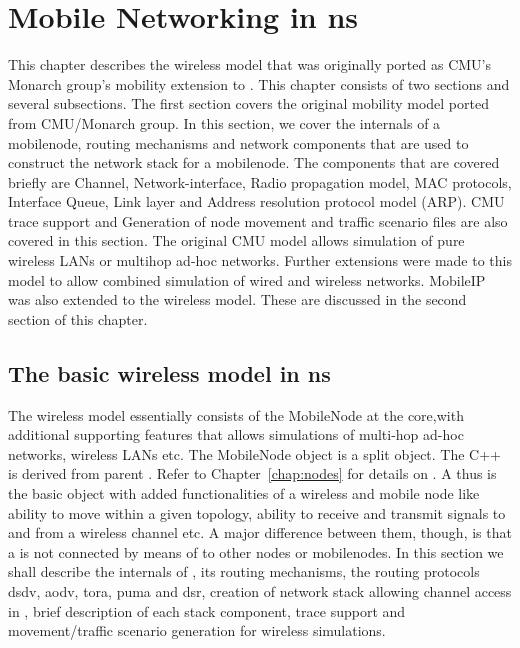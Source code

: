 %
\chapter{Mobile Networking in ns}
\label{chap:mobility}

This chapter describes the wireless model that was originally ported as CMU's Monarch group's mobility extension to \ns. 
This chapter consists of two sections and several subsections. The
first section covers the original mobility model ported from
CMU/Monarch group. In this section, we cover the internals of a
mobilenode, routing mechanisms and network components that are used to
construct the network stack for a mobilenode. The components that are
covered briefly are Channel, Network-interface, Radio propagation
model, MAC protocols, Interface Queue, Link layer and Address
resolution protocol model (ARP). CMU trace support and Generation of
node movement and traffic scenario files are also covered in this
section. 
The original CMU model allows simulation of pure wireless LANs or
multihop ad-hoc networks. Further extensions were made to this model
to allow combined simulation of wired and wireless networks. MobileIP
was also extended to the wireless model. These are
discussed in the second section of this chapter.                


\section{The basic wireless model in ns}
\label{sec:basic-model}

The wireless model essentially consists of the MobileNode at the core,with
additional supporting features that allows simulations of multi-hop ad-hoc
networks, wireless LANs etc. The MobileNode object is a split object. The
C++  is derived from parent
. Refer to Chapter~\ref{chap:nodes} for
details on . A  thus is the basic 
object with added functionalities of a wireless and mobile node like
ability to move within a given topology, ability to receive and transmit
signals to and from a wireless channel etc. A major difference between
them, though, is that a  is not connected by means of
 to other nodes or mobilenodes. In this section we shall
describe the internals of , its routing mechanisms, the
routing protocols dsdv, aodv, tora, puma and dsr, creation of network stack
allowing channel
access in , brief description of each stack component,
trace support and movement/traffic scenario generation for wireless
simulations. 


